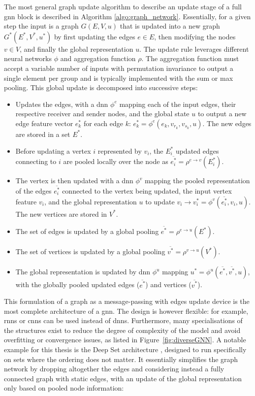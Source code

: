 The most general graph update algorithm to describe an update stage of a full \gls{gnn} block is described in Algorithm \ref{algo:graph_network}. Essentially, for a given step the input is a graph $G(E, V, u)$ that is updated into a new graph $G^*(E^*, V^*, u^*)$ by first updating the edges $e \in E$, then modifying the nodes $v \in V$, and finally the global representation $u$. The update rule leverages different neural networks $\phi$ and aggregation function $\rho$. The aggregation function must accept a variable number of inputs with permutation invariance to output a single element per group and is typically implemented with the sum or max pooling. This global update is decomposed into successive steps: 
\begin{itemize}
    \item Updates the edges, with a \gls{dnn} $\phi^e$ mapping each of the input edges, their respective receiver and sender nodes, and the global state $u$ to output a new edge feature vector $e^*_k$ for each edge $k$: $e^*_k = \phi^e(e_k, v_{r_k}, v_{s_k}, u)$. The new edges are stored in a set $E^*$. 
    \item Before updating a vertex $i$ represented by $v_i$, the $E_i^*$ updated edges connecting to $i$ are pooled locally over the node as $\overline{e^*_i} = \rho^{e \rightarrow v}(E_i^*)$.
    \item The vertex is then updated with a \gls{dnn} $\phi^v$ mapping the pooled representation of the edges $\overline{e^*_i}$ connected to the vertex being updated, the input vertex feature $v_i$, and the global representation $u$ to update $v_i \rightarrow v^*_i = \phi^v(\overline{e^*_i}, v_i, u)$. The new vertices are stored in $V^*$.
    \item The set of edges is updated by a global pooling $\overline{e^*} = \rho^{e \rightarrow u}(E^*)$.
    \item The set of vertices is updated by a global pooling $\overline{v^*} = \rho^{v \rightarrow u}(V^*)$.
    \item The global representation is updated by \gls{dnn} $\phi^u$ mapping $u^* = \phi^u(\overline{e^*}, \overline{v^*}, u)$, with the globally pooled updated edges ($\overline{e^*}$) and vertices ($\overline{v^*}$). 
\end{itemize} 
This formulation of a graph as a message-passing with edges update device is the most complete architecture of a \gls{gnn}. The design is however flexible: for example, \glspl{rnn} or \glspl{cnn} can be used instead of \glspl{dnn}. Furthermore, many specialisations of the structures exist to reduce the degree of complexity of the model and avoid overfitting or convergence issues, as listed in Figure~\ref{fig:diverseGNN}. A notable example for this thesis is the Deep Set architecture \cite{NIPS2017f22e4747}, designed to run specifically on sets where the ordering does not matter. It essentially simplifies the graph network by dropping altogether the edges and considering instead a fully connected graph with static edges, with an update of the global representation only based on pooled node information: 
